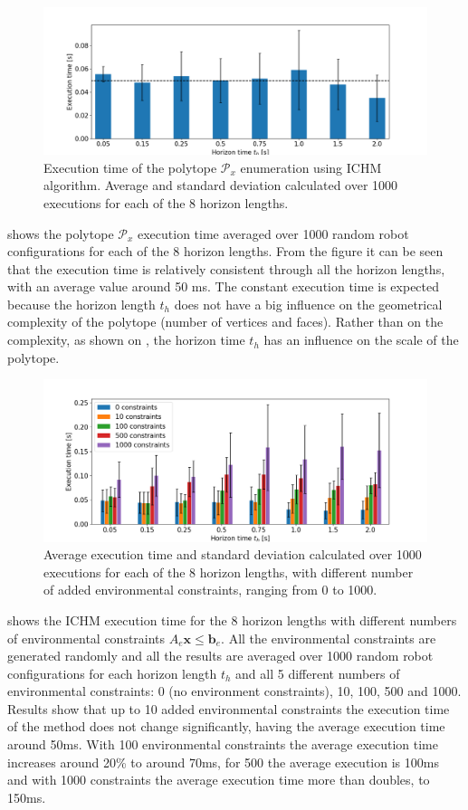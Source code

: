 \begin{figure}[!h]
    \centering
    \includegraphics[width=0.9\linewidth]{Papers/images/time.png}
    \caption{Execution time of the polytope $\mathcal{P}_x$ enumeration using ICHM algorithm. Average and standard deviation calculated over 1000 executions for each of the 8 horizon lengths.}
    \label{fig:exec_time}
\end{figure}
 shows the polytope $\mathcal{P}_x$ execution time averaged over 1000 random robot configurations for each of the 8 horizon lengths. From the figure it can be seen that the execution time is relatively consistent through all the horizon lengths, with an average value around 50 ms. The constant execution time is expected because the horizon length $t_h$ does not have a big influence on the geometrical complexity of the polytope (number of vertices and faces). Rather than on the complexity, as shown on , the horizon time $t_h$ has an influence on the scale of the polytope.

\begin{figure}[!h]
    \centering
    \includegraphics[width=0.9\linewidth]{Papers/images/time_constriant.png}
    \caption{Average execution time and standard deviation calculated over 1000 executions for each of the 8 horizon lengths, with different number of added environmental constraints, ranging from 0 to 1000.}
    \label{fig:exec_time_constraints}
\end{figure}
 shows the ICHM execution time for the 8 horizon lengths with different numbers of environmental constraints $A_e\bm{x}\!\leq\!\bm{b}_e$. All the environmental constraints are generated randomly and all the results are averaged over 1000 random robot configurations for each horizon length $t_h$ and all 5 different numbers of environmental constraints: 0 (no environment constraints), 10, 100, 500 and 1000. Results show that up to 10 added environmental constraints the execution time of the method does not change significantly, having the average execution time around 50ms. With 100 environmental constraints the average execution time increases around 20\% to around 70ms, for 500 the average execution is 100ms and with 1000 constraints the average execution time more than doubles, to 150ms.   


